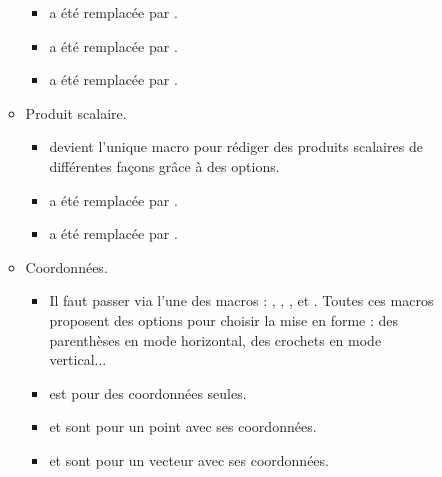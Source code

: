 \documentclass[12pt,a4paper]{book}
\begin{document}
\begin{description}
\begin{itemize}[itemsep=.5em]
\begin{itemize}[itemsep=.5em]
\begin{itemize}[itemsep=.5em, label=$\rightarrow$]
            \item {}  a été remplacée par .
            
            \item {}  a été remplacée par .
                  
            \item {} a été remplacée par .
	    \end{itemize}


        \item Produit scalaire.
        
        \begin{itemize}[itemsep=.5em, label=$\rightarrow$]
            \item {} devient l'unique macro pour rédiger des produits scalaires de différentes façons grâce à des options.
            
            \item {}  a été remplacée par .

            \item {} a été remplacée par .
	    \end{itemize}


        \item Coordonnées.
        
        \begin{itemize}[itemsep=.5em, label=$\rightarrow$]
            \item Il faut passer via l'une des macros : , , ,  et .
                  Toutes ces macros proposent des options pour choisir la mise en forme : des parenthèses en mode horizontal, des crochets en mode vertical...

            \item {} est pour des coordonnées seules.

            \item {} et  sont pour un point avec ses coordonnées.

            \item {} et  sont pour un vecteur avec ses coordonnées.


\end{itemize}
\end{itemize}
\end{itemize}
\end{description}
\end{document}

